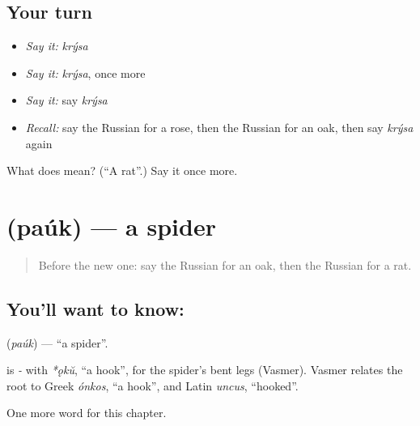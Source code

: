 \subsection*{Your turn}
\begin{itemize}
\raggedright
  \item \emph{Say it:} \emph{krýsa}
  \item \emph{Say it:} \emph{krýsa}, once more
  \item \emph{Say it:} say \emph{krýsa}
  \item \emph{Recall:} say the Russian for a rose, then the Russian for an oak, then say \emph{krýsa} again
\end{itemize}

\begin{tcolorbox}[breakable,colback=teal!4,colframe=teal!35!black,title={Before you move on}]
What does  mean? (\textquotedblleft{}A rat\textquotedblright{}.) Say it once more.
\end{tcolorbox}
\section[\texorpdfstring{\ru{паук} (paúk)}{паук (paúk)}]{ (paúk) — a spider}

\label{lesson:RU-C196-pauk}



\begin{quote}
Before the new one: say the Russian for an oak, then the Russian for a rat.
\end{quote}

\subsection*{You'll want to know: }
\textbf{} (\emph{paúk}) — \textquotedblleft{}a spider\textquotedblright{}.

\begin{cousinweb}
\textbf{} is \emph{-} with \emph{*ǫkŭ}, \textquotedblleft{}a hook\textquotedblright{}, for the spider's bent legs (Vasmer). Vasmer relates the root to Greek \emph{ónkos}, \textquotedblleft{}a hook\textquotedblright{}, and Latin \emph{uncus}, \textquotedblleft{}hooked\textquotedblright{}.
\end{cousinweb}

\begin{grammarlens}[title={What you've built}]
One more word for this chapter.
\end{grammarlens}

